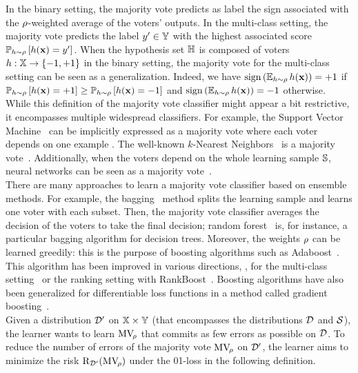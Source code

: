 In the binary setting, the majority vote predicts as label the sign associated with the $\Q$-weighted average of the voters' outputs.
In the multi-class setting, the majority vote predicts the label $\y'\in\Y$ with the highest associated score $\PP_{\h\sim\Q}\LB \h(\x) = \y'\RB$.
When the hypothesis set $\H$ is composed of voters $\h:\X\to \{-1,+1\}$ in the binary setting, the majority vote for the multi-class setting can be seen as a generalization.
Indeed, we have $\sign\LP \EE_{\h\sim\Q}\h(\x)\RP=+1$ if $\PP_{\h\sim\Q}\LB \h(\x) = +1\RB \ge \PP_{\h\sim\Q}\LB \h(\x) = -1\RB$ and $\sign\LP \EE_{\h\sim\Q}\h(\x)\RP=-1$ otherwise.\\

While this definition of the majority vote classifier might appear a bit restrictive, it encompasses multiple widespread classifiers.
For example, the Support Vector Machine~\citep{CortesVapnik1995} can be implicitly expressed as a majority vote where each voter depends on one example \citep{GraepelHerbrichShaweTaylor2005}.
The well-known $k$-Nearest Neighbors~\citep{CoverHart1967} is a majority vote~\citep{BelletHabrardMorvantSebban2014}.
Additionally, when the voters depend on the whole learning sample $\S$, neural networks can be seen as a majority vote~\citep{KawaguchiPackKaelblingBengio2017, ViallardGermainHabrardMorvant2019}.\\

There are many approaches to learn a majority vote classifier based on ensemble methods.
For example, the bagging~\citep{Breiman1996} method splits the learning sample and learns one voter with each subset.
Then, the majority vote classifier averages the decision of the voters to take the final decision; random forest~\citep{Breiman2001} is, for instance, a particular bagging algorithm for decision trees.
Moreover, the weights $\Q$ can be learned greedily: this is the purpose of boosting algorithms such as Adaboost~\citep{FreundSchapire1996}.
This algorithm has been improved in various directions, \eg, for the multi-class setting~\citep{SchapireSinger1998,SchapireSinger1999,SchapireSinger2000,ZhuZouRossetHastie2009} or the ranking setting with RankBoost~\citep{FreundIyerSchapireSinger1998,FreundIyerSchapireSinger2003}.
Boosting algorithms have also been generalized for differentiable loss functions in a method called gradient boosting~\citep{Friedman2001}.\\

Given a distribution $\Dp$ on $\X\times\Y$ (that encompasses the distributions $\D$ and $\dS$), the learner wants to learn $\MVQ$ that commits as few errors as possible on $\D$.
To reduce the number of errors of the majority vote $\MVQ$ on $\Dp$, the learner aims to minimize the risk $\Risk_{\Dp}(\MVQ)$ under the 01-loss in the following definition.

